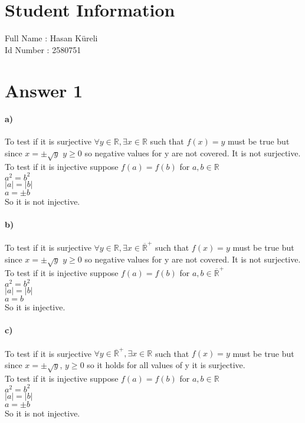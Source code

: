 \documentclass[12pt]{article}
\begin{document}
\section*{Student Information } 
Full Name :  Hasan Küreli\\
Id Number :  2580751\\

\section*{Answer 1}
\paragraph{a)} 
To test if it is surjective $\forall y \in \mathbb{R} , \exists x \in \mathbb{R}$ such that $f(x) = y$ must be true but since  $x= \pm \sqrt{y}$ $ y\ge 0$ so negative values for y are not covered. It is not surjective. \\
To test if it is injective suppose $f(a) = f(b)$ for $a,b\in \mathbb{R}$\\
$a^2 = b^2$\\
$|a| = |b|$\\$a=\pm b$\\
So it is not injective.

\paragraph{b)}
To test if it is surjective $\forall y \in \mathbb{R} , \exists x \in\overline{\mathbb{R}}^{+}$ such that $f(x) = y$ must be true but since  $x= \pm \sqrt{y}$ $ y\ge 0$ so negative values for y are not covered. It is not surjective. \\
To test if it is injective suppose $f(a) = f(b)$ for $a,b\in \overline{\mathbb{R}}^{+}$\\
$a^2 = b^2$\\
$|a| = |b|$\\$a=b$\\
So it is injective.

\paragraph{c)}
To test if it is surjective $\forall y \in \overline{\mathbb{R}}^{+} , \exists x \in \mathbb{R}$ such that $f(x) = y$ must be true but since  $x= \pm \sqrt{y}$, $ y\ge 0$ so it holds for all values of y it is surjective. \\
To test if it is injective suppose $f(a) = f(b)$ for $a,b\in \mathbb{R}$\\
$a^2 = b^2$\\
$|a| = |b|$\\$a=\pm b$\\
So it is not injective.
\end{document}
